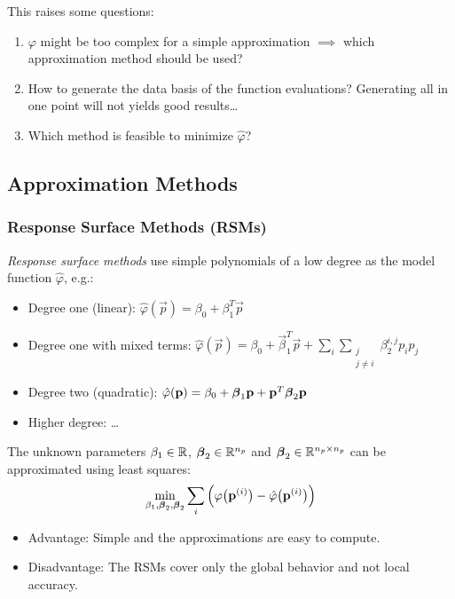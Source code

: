 		This raises some questions:
		\begin{enumerate}
			\item \(\varphi\) might be too complex for a simple approximation \(\implies\) which approximation method should be used?
			\item How to generate the data basis of the function evaluations? Generating all in one point will not yields good results\dots
			\item Which method is feasible to minimize \(\hat{\varphi}\)?
		\end{enumerate}

		\subsection{Approximation Methods}
			\subsubsection{Response Surface Methods (RSMs)}
				\emph{Response surface methods} use simple polynomials of a low degree as the model function \(\hat{\varphi}\), e.g.:
				\begin{itemize}
					\item Degree one (linear): \tabto{5.5cm} \( \hat{\varphi}(\vec{p}) = \beta_0 + \beta_1^T \vec{p} \)
					\item Degree one with mixed terms: \tabto{5.5cm} \( \hat{\varphi}(\vec{p}) = \beta_0 + \vec{\beta}_1^T \vec{p} + \sum_{i} \sum_{\substack{j \\ j \neq i}} \beta_2^{i, j} p_i p_j \)
					\item Degree two (quadratic): \tabto{5.5cm} \( \hat{\varphi}(\boldsymbol{\mathrm{p}}) = \beta_0 + \boldsymbol{\mathrm{\beta}}_1 \boldsymbol{\mathrm{p}} + \boldsymbol{\mathrm{p}}^T \boldsymbol{\mathrm{\beta}}_2 \boldsymbol{\mathrm{p}} \)
					\item Higher degree: \dots
				\end{itemize}
				The unknown parameters \( \beta_1 \in \mathbb{R} \), \( \boldsymbol{\mathrm{\beta}}_2 \in \mathbb{R}^{n_p} \) and \( \boldsymbol{\mathrm{\beta}}_2 \in \mathbb{R}^{n_p \times n_p} \) can be approximated using least squares:
				\begin{align*}
					\min_{\beta_1, \boldsymbol{\mathrm{\beta}}_2, \boldsymbol{\mathrm{\beta}}_2} \sum_i \Big( \varphi\big(\boldsymbol{\mathrm{p}}^{(i)}\big) - \hat{\varphi}\big(\boldsymbol{\mathrm{p}}^{(i)}\big) \Big)
				\end{align*}
				
				\begin{itemize}
					\item Advantage: Simple and the approximations are easy to compute.
					\item Disadvantage: The RSMs cover only the global behavior and not local accuracy.
				\end{itemize}

